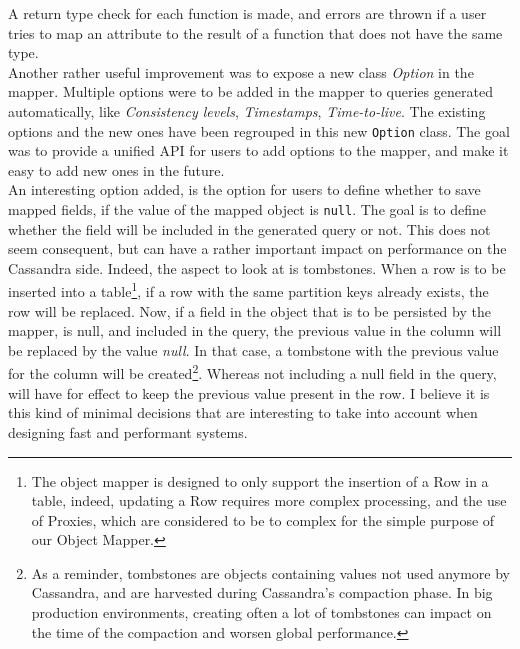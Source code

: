 \documentclass[a4paper]{report}
\begin{document}
A return type check for each function is made, and errors are thrown if a user tries to map an attribute to the result of a function that does not have the same type.\\
Another rather useful improvement was to expose a new class \emph{Option} in the mapper. Multiple options were to be added in the mapper to queries generated automatically, like \emph{Consistency levels}, \emph{Timestamps}, \emph{Time-to-live}. The existing options and the new ones have been regrouped in this new \verb;Option; class. The goal was to provide a unified API for users to add options to the mapper, and make it easy to add new ones in the future.\\
An interesting option added, is the option for users to define whether to save mapped fields, if the value of the mapped object is \verb;null;. The goal is to define whether the field will be included in the generated query or not. This does not seem consequent, but can have a rather important impact on performance on the Cassandra side. Indeed, the aspect to look at is tombstones. When a row is to be inserted into a table\footnote{The object mapper is designed to only support the insertion of a Row in a table, indeed, updating a Row requires more complex processing, and the use of Proxies, which are considered to be to complex for the simple purpose of our Object Mapper.}, if a row with the same partition keys already exists, the row will be replaced. Now, if a field in the object that is to be persisted by the mapper, is null, and included in the query, the previous value in the column will be replaced by the value \emph{null}. In that case, a tombstone with the previous value for the column will be created\footnote{As a reminder, tombstones are objects containing values not used anymore by Cassandra, and are harvested during Cassandra's compaction phase. In big production environments, creating often a lot of tombstones can impact on the time of the compaction and worsen global performance.}. Whereas not including a null field in the query, will have for effect to keep the previous value present in the row. I believe it is this kind of minimal decisions that are interesting to take into account when designing fast and performant systems.
\end{document}
